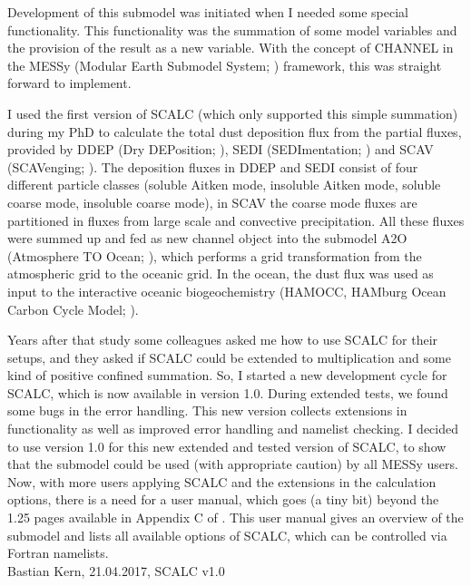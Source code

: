 \documentclass[twoside]{article}
\begin{document}
Development of this submodel was initiated when I needed some special functionality.
This functionality was the summation of some model variables and the provision of the result as a new variable.
With the concept of CHANNEL in the MESSy (Modular Earth Submodel System; \citealt{Jockel2005,Jockel2010}) framework, this was straight forward to implement.

I used the first version of SCALC (which only supported this simple summation) during my PhD \citep{Kern2013} to calculate the total dust deposition flux from the partial fluxes, provided by DDEP (Dry DEPosition; \citealp{Kerkweg2006}), SEDI (SEDImentation; \citealp{Kerkweg2006}) and SCAV (SCAVenging; \citealp{Tost2006}).
The deposition fluxes in DDEP and SEDI consist of four different particle classes (soluble Aitken mode, insoluble Aitken mode, soluble coarse mode, insoluble coarse mode), in SCAV the coarse mode fluxes are partitioned in fluxes from large scale and convective precipitation.
All these fluxes were summed up and fed as new channel object into the submodel A2O (Atmosphere TO Ocean; \citealp{Pozzer2011}), which performs a grid transformation from the atmospheric grid to the oceanic grid.
In the ocean, the dust flux was used as input to the interactive oceanic biogeochemistry (HAMOCC, HAMburg Ocean Carbon Cycle Model; \citealp{Maier-Reimer2005, Wetzel2005, Kern2013}).

Years after that study some colleagues asked me how to use SCALC for their setups, and they asked if SCALC could be extended to multiplication and some kind of positive confined summation.
So, I started a new development cycle for SCALC, which is now available in version 1.0.
During extended tests, we found some bugs in the error handling.
This new version collects extensions in functionality as well as improved error handling and namelist checking.
I decided to use version 1.0 for this new extended and tested version of SCALC, to show that the submodel could be used (with appropriate caution) by all MESSy users.
Now, with more users applying SCALC and the extensions in the calculation options, there is a need for a user manual, which goes (a tiny bit) beyond the 1.25 pages available in Appendix C of \citet{Kern2013}.
This user manual gives an overview of the submodel and lists all available options of SCALC, which can be controlled via Fortran namelists.\\

Bastian Kern, 21.04.2017, SCALC v1.0\\
\end{document}
